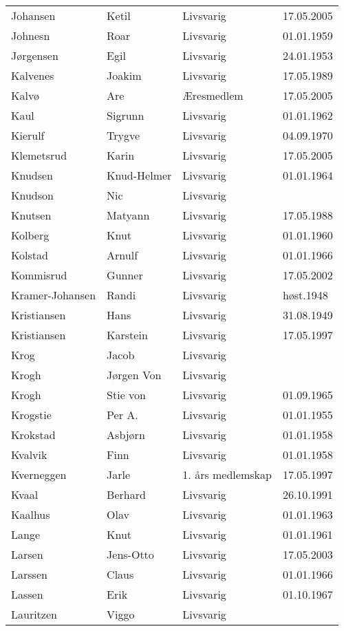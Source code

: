 \begin{longtable}{llll}
Johansen 	&	Ketil	&	Livsvarig	&	17.05.2005	\\
Johnesn	&	Roar	&	Livsvarig 	&	01.01.1959	\\
Jørgensen	&	Egil	&	Livsvarig 	&	24.01.1953	\\
Kalvenes	&	Joakim	&	Livsvarig 	&	17.05.1989	\\
Kalvø 	&	Are 	&	Æresmedlem	&	17.05.2005	\\
Kaul	&	Sigrunn	&	Livsvarig 	&	01.01.1962	\\
Kierulf	&	Trygve	&	Livsvarig 	&	04.09.1970	\\
Klemetsrud 	&	Karin	&	Livsvarig	&	17.05.2005	\\
Knudsen	&	Knud-Helmer	&	Livsvarig 	&	01.01.1964	\\
Knudson	&	Nic	&	Livsvarig 	&		\\
Knutsen	&	Matyann	&	Livsvarig 	&	17.05.1988	\\
Kolberg	&	Knut	&	Livsvarig 	&	01.01.1960	\\
Kolstad	&	Arnulf	&	Livsvarig 	&	01.01.1966	\\
Kommisrud 	&	Gunner	&	Livsvarig	&	17.05.2002	\\
Kramer-Johansen	&	Randi	&	Livsvarig 	&	høst.1948	\\
Kristiansen	&	Hans	&	Livsvarig 	&	31.08.1949	\\
Kristiansen 	&	Karstein	&	Livsvarig	&	17.05.1997	\\
Krog	&	Jacob	&	Livsvarig 	&		\\
Krogh	&	Jørgen Von	&	Livsvarig 	&		\\
Krogh	&	Stie von	&	Livsvarig 	&	01.09.1965	\\
Krogstie	&	Per A.	&	Livsvarig 	&	01.01.1955	\\
Krokstad	&	Asbjørn	&	Livsvarig 	&	01.01.1958	\\
Kvalvik	&	Finn	&	Livsvarig 	&	01.01.1958	\\
Kverneggen 	&	Jarle 	&	1. års medlemskap	&	17.05.1997	\\
Kvaal	&	Berhard	&	Livsvarig 	&	26.10.1991	\\
Kaalhus	&	Olav	&	Livsvarig 	&	01.01.1963	\\
Lange	&	Knut	&	Livsvarig 	&	01.01.1961	\\
Larsen 	&	Jens-Otto	&	Livsvarig	&	17.05.2003	\\
Larssen	&	Claus	&	Livsvarig 	&	01.01.1966	\\
Lassen	&	Erik	&	Livsvarig 	&	01.10.1967	\\
Lauritzen	&	Viggo	&	Livsvarig 	&		\\

\end{longtable}
